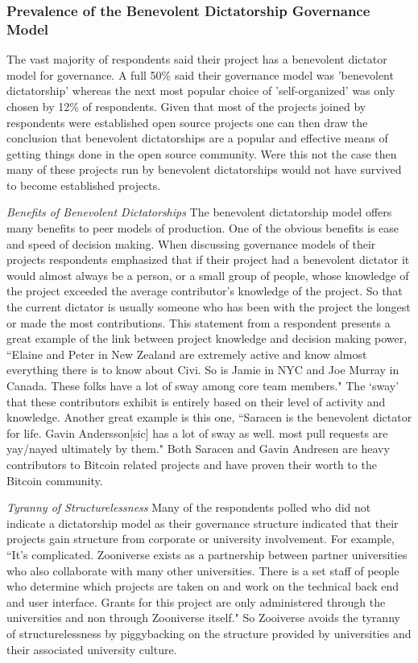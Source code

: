 \subsubsection{Prevalence of the Benevolent Dictatorship Governance Model}

The vast majority of respondents said their project has a benevolent dictator model for governance.  A full 50\% said their governance model was 'benevolent dictatorship' whereas the next most popular choice of 'self-organized' was only chosen by 12\% of respondents.  Given that most of the projects joined by respondents were established open source projects one can then draw the conclusion that benevolent dictatorships are a popular and effective means of getting things done in the open source community.  Were this not the case then many of these projects run by benevolent dictatorships would not have survived to become established projects.

{\it Benefits of Benevolent Dictatorships} The benevolent dictatorship model offers many benefits to peer models of production.  One of the obvious benefits is ease and speed of decision making.  When discussing governance models of their projects respondents emphasized that if their project had a benevolent dictator it would almost always be a person, or a small group of people, whose knowledge of the project exceeded the average contributor's knowledge of the project.  So that the current dictator is usually someone who has been with the project the longest or made the most contributions.  This statement from a respondent presents a great example of the link between project knowledge and decision making power, ``Elaine and Peter in New Zealand are extremely active and know almost everything there is to know about Civi. So is Jamie in NYC and Joe Murray in Canada. These folks have a lot of sway among core team members."  The `sway' that these contributors exhibit is entirely based on their level of activity and knowledge.  Another great example is this one, ``Saracen is the benevolent dictator for life. Gavin Andersson[sic] has a lot of sway as well. most pull requests are yay/nayed ultimately by them."  Both Saracen and Gavin Andresen are heavy contributors to Bitcoin related projects and have proven their worth to the Bitcoin community.

{\it Tyranny of Structurelessness} Many of the respondents polled who did not indicate a dictatorship model as their governance structure indicated that their projects gain structure from corporate or university involvement.  For example, ``It's complicated. Zooniverse exists as a partnership between partner universities who also collaborate with many other universities. There is a set staff of people who determine which projects are taken on and work on the technical back end and user interface. Grants for this project are only administered through the universities and non through Zooniverse itself."  So Zooiverse avoids the tyranny of structurelessness by piggybacking on the structure provided by universities and their associated university culture.


